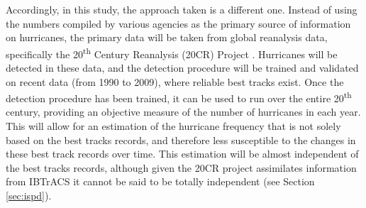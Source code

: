 \documentclass[pdftex,12pt,a4paper]{report}
\newcommand{\ts}{\textsuperscript}
\begin{document}
Accordingly, in this study, the approach taken is a different one. Instead of using the numbers
compiled by various agencies as the primary source of information on hurricanes, the primary data
will be taken from global reanalysis data, specifically the 20\ts{th} Century Reanalysis (20CR)
Project \parencite{compoTwentieth2011}. Hurricanes will be detected in these data, and the detection
procedure will be trained and validated on recent data (from 1990 to 2009), where reliable best
tracks exist. Once the detection procedure has been trained, it can be used to run over the entire
20\ts{th} century, providing an objective measure of the number of hurricanes in each year. This
will allow for an estimation of the hurricane frequency that is not solely based on the best tracks
records, and therefore less susceptible to the changes in these best track records over time. This
estimation will be almost independent of the best tracks records, although given the 20CR project
assimilates information from IBTrACS it cannot be said to be totally independent (see Section
\ref{sec:ispd}).



\end{document}
